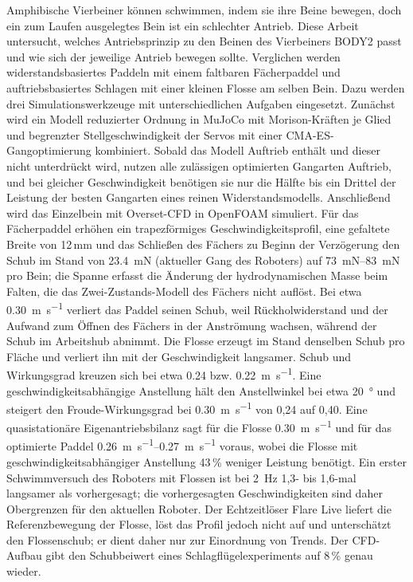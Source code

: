 \vspace{12mm}
\vspace{6mm}
\noindent\begingroup{}
Amphibische Vierbeiner können schwimmen, indem sie ihre Beine bewegen, doch ein zum Laufen ausgelegtes Bein
ist ein schlechter Antrieb. Diese Arbeit untersucht, welches Antriebsprinzip zu den Beinen des Vierbeiners
BODY2 passt und wie sich der jeweilige Antrieb bewegen sollte. Verglichen werden widerstandsbasiertes Paddeln
mit einem faltbaren Fächerpaddel und auftriebsbasiertes Schlagen mit einer kleinen Flosse am selben Bein. Dazu
werden drei Simulationswerkzeuge mit unterschiedlichen Aufgaben eingesetzt. Zunächst wird ein Modell reduzierter Ordnung in
MuJoCo mit Morison-Kräften je Glied und begrenzter Stellgeschwindigkeit der Servos mit einer CMA-ES-Gangoptimierung kombiniert.
Sobald das Modell Auftrieb enthält und dieser nicht unterdrückt wird, nutzen alle zulässigen optimierten Gangarten Auftrieb, und bei gleicher Geschwindigkeit benötigen
sie nur die Hälfte bis ein Drittel der Leistung der besten Gangarten eines reinen Widerstandsmodells. Anschließend
wird das Einzelbein mit Overset-CFD in OpenFOAM simuliert. Für das Fächerpaddel erhöhen ein trapezförmiges
Geschwindigkeitsprofil, eine gefaltete Breite von 12\,mm und das Schließen des Fächers zu Beginn der
Verzögerung den Schub im Stand von \SI{23.4}{\milli\newton} (aktueller Gang des Roboters) auf
\SIrange{73}{83}{\milli\newton} pro Bein; die Spanne erfasst die Änderung der hydrodynamischen Masse beim Falten, die das
Zwei-Zustands-Modell des Fächers nicht auflöst. Bei etwa \SI{0.30}{\metre\per\second} verliert das Paddel seinen Schub, weil
Rückholwiderstand und der Aufwand zum Öffnen des Fächers in der Anströmung wachsen, während der Schub im Arbeitshub abnimmt.
Die Flosse erzeugt im Stand denselben Schub pro Fläche und verliert ihn mit der Geschwindigkeit langsamer. Schub und Wirkungsgrad kreuzen sich bei etwa
\SI{0.24}{} bzw. \SI{0.22}{\metre\per\second}.
Eine geschwindigkeitsabhängige Anstellung hält den Anstellwinkel bei etwa \SI{20}{\degree} und steigert den
Froude-Wirkungsgrad bei \SI{0.30}{\metre\per\second} von 0,24 auf 0,40. Eine quasistationäre
Eigenantriebsbilanz sagt für die Flosse \SI{0.30}{\metre\per\second} und für das optimierte Paddel
\SIrange{0.26}{0.27}{\metre\per\second} voraus, wobei die Flosse mit geschwindigkeitsabhängiger Anstellung 43\,\% weniger
Leistung benötigt. Ein erster Schwimmversuch des Roboters mit Flossen ist bei \SI{2}{\hertz} 1,3- bis 1,6-mal langsamer als
vorhergesagt; die vorhergesagten Geschwindigkeiten sind daher Obergrenzen für den aktuellen Roboter. Der Echtzeitlöser Flare Live
liefert die Referenzbewegung der Flosse, löst das Profil jedoch nicht auf und unterschätzt den Flossenschub; er dient daher nur zur
Einordnung von Trends. Der CFD-Aufbau gibt den Schubbeiwert eines Schlagflügelexperiments auf 8\,\% genau wieder.\endgroup
\cleardoublepage
